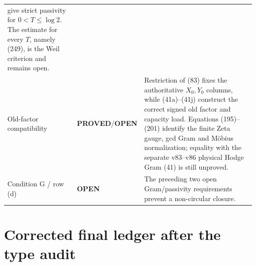 \documentclass[11pt]{article}
\newcommand{\PROVED}{\textcolor{green!45!black}{\textbf{PROVED}}}
\newcommand{\OPEN}{\textcolor{red!70!black}{\textbf{OPEN}}}
\begin{document}
\begin{center}
\begin{tabular}{p{}p{}p{}}
give strict passivity for $0<T\le\log2$.  The estimate for every $T$, namely
(249), is the Weil criterion and remains open. \\
Old-factor compatibility & \PROVED/\OPEN & Restriction of (83) fixes the
authoritative $X_0,Y_0$ columns, while (41a)--(41j) construct the correct
signed old factor and capacity load.  Equations (195)--(201) identify the
finite Zeta gauge, gcd Gram and M\"obius normalization; equality with the
separate v83--v86 physical Hodge Gram (41) is still unproved. \\
Condition G / row (d) & \OPEN & The preceding two open Gram/passivity
requirements prevent a non-circular closure. \\
\hline
\end{tabular}
\end{center}

\section{Corrected final ledger after the type audit}
\end{document}
